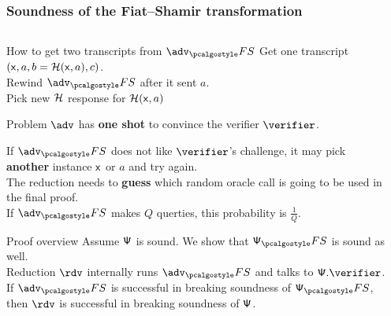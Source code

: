 \documentclass[aspectratio=169,handout]{beamer}
\renewcommand{\emph}[1]{\textbf{#1}}
\begin{document}
\begin{frame}[t]
  \frametitle{Soundness of the Fiat--Shamir transformation}
  \begin{columns}
    \begin{column}{0.7\linewidth}
  \begin{block}{How to get two transcripts from $\advfs$}
    Get one transcript $(\mathsf{x}, a, b = \mathcal{H}(\mathsf{x}, a), c)$.\\
    Rewind $\advfs$ after it sent $a$.\\
    Pick new $\mathcal{H}$ response for $\mathcal{H}(\mathsf{x}, a)$
  \end{block}
  \begin{block}{Problem}
    $\adv$ has \emph{one shot} to convince the verifier $\verifier$.

    If $\advfs$ does not like $\verifier$'s challenge, it may pick \emph{another}
    instance $\mathsf{x}$ or $a$ and try again.\\[\myskip]
    The reduction needs to \emph{guess} which random oracle call is going to be
    used in the final proof.\\
    If $\advfs$ makes $Q$ querties, this probability is $\frac{1}{Q}$.
  \end{block}

  \begin{block}{Proof overview}
    Assume ${\mathsf{\Psi}}$ is sound. We show that $\PS_\fs$ is sound as well.\\[\myskip]
    Reduction $\rdv$ internally runs $\advfs$ and talks to $\PS.\verifier$.\\
    If $\advfs$ is successful in breaking soundness of $\PS_\fs$, then $\rdv$ is
    successful in breaking soundness of ${\mathsf{\Psi}}$.
  \end{block}
\end{column}
\begin{column}{0.3\linewidth}
\end{column}
\end{columns}
\end{frame}
\end{document}
